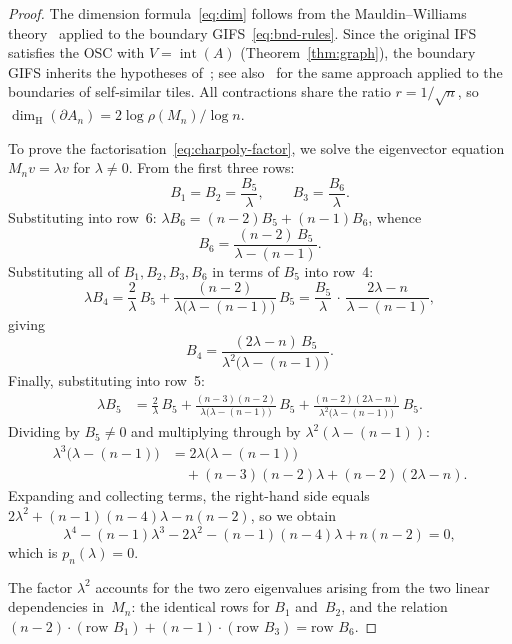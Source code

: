 \documentclass{amsart}
\theoremstyle{definition}
\theoremstyle{remark}
\newcommand{\dH}{\dim_{\mathrm{H}}}
\begin{document}
\begin{proof}
The dimension formula~\eqref{eq:dim} follows from the
Mauldin--Williams theory~\cite{mauldin-williams} applied to the
boundary GIFS~\eqref{eq:bnd-rules}.  Since the original IFS
satisfies the OSC with $V = \operatorname{int}(A)$
(Theorem~\ref{thm:graph}), the boundary GIFS inherits the
hypotheses of~\cite{mauldin-williams};
see also~\cite{duvall-keesling-strichartz} for the same approach
applied to the boundaries of self-similar tiles.  All contractions
share the ratio $r = 1/\sqrt{n}$, so
$\dH(\partial A_n) = 2\log\rho(M_n)/\log n$.

To prove the factorisation~\eqref{eq:charpoly-factor}, we solve the
eigenvector equation $M_n v = \lambda v$ for $\lambda \ne 0$.
From the first three rows:
\[
  B_1 = B_2 = \frac{B_5}{\lambda}, \qquad
  B_3 = \frac{B_6}{\lambda}.
\]
Substituting into row~6:
$\lambda B_6 = (n{-}2) B_5 + (n{-}1) B_6$, whence
\begin{equation}\label{eq:B6-from-B5}
  B_6 = \frac{(n{-}2)\, B_5}{\lambda - (n{-}1)}.
\end{equation}
Substituting all of $B_1, B_2, B_3, B_6$ in terms of $B_5$ into row~4:
\[
  \lambda B_4 = \frac{2}{\lambda}\, B_5
    + \frac{(n{-}2)}{\lambda\bigl(\lambda-(n{-}1)\bigr)}\, B_5
  = \frac{B_5}{\lambda}\,\cdot\, \frac{2\lambda - n}{\lambda - (n{-}1)},
\]
giving
\begin{equation}\label{eq:B4-from-B5}
  B_4 = \frac{(2\lambda - n)\, B_5}
    {\lambda^2\bigl(\lambda - (n{-}1)\bigr)}.
\end{equation}
Finally, substituting into row~5:
\begin{align*}
  \lambda B_5 &= \frac{2}{\lambda}\, B_5
    + \frac{(n{-}3)(n{-}2)}{\lambda\bigl(\lambda-(n{-}1)\bigr)}\, B_5
    + \frac{(n{-}2)(2\lambda-n)}
      {\lambda^2\bigl(\lambda-(n{-}1)\bigr)}\, B_5.
\end{align*}
Dividing by $B_5 \ne 0$ and multiplying through by
$\lambda^2(\lambda-(n{-}1))$:
\begin{align*}
  \lambda^3\bigl(\lambda-(n{-}1)\bigr)
  &= 2\lambda\bigl(\lambda-(n{-}1)\bigr) \\
  &\quad + (n{-}3)(n{-}2)\lambda + (n{-}2)(2\lambda-n).
\end{align*}
Expanding and collecting terms, the right-hand side equals
$2\lambda^2 + (n{-}1)(n{-}4)\lambda - n(n{-}2)$, so we obtain
\[
  \lambda^4 - (n{-}1)\lambda^3 - 2\lambda^2
    - (n{-}1)(n{-}4)\lambda + n(n{-}2) = 0,
\]
which is $p_n(\lambda) = 0$.

The factor $\lambda^2$ accounts for the two zero eigenvalues arising from
the two linear dependencies in~$M_n$: the identical rows for $B_1$
and~$B_2$, and the relation
$(n{-}2) \cdot (\text{row } B_1) + (n{-}1) \cdot (\text{row } B_3)
 = \text{row } B_6$.
\end{proof}
\end{document}
